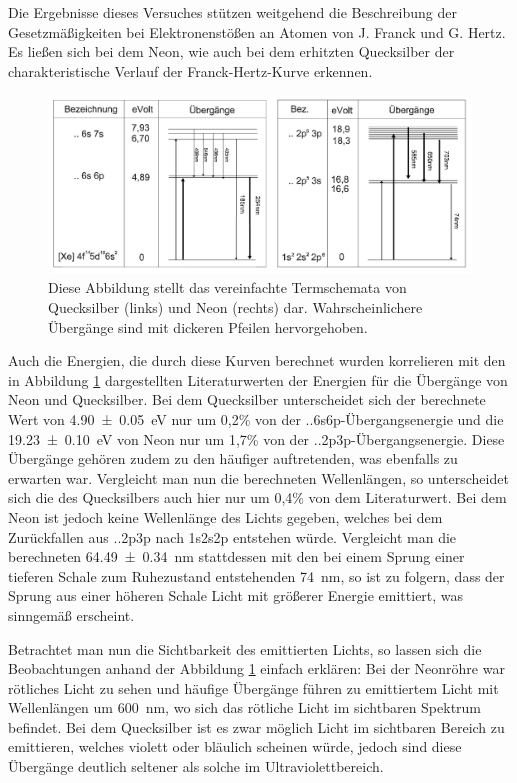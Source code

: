 	Die Ergebnisse dieses Versuches stützen weitgehend die Beschreibung der Gesetzmäßigkeiten bei Elektronenstößen an Atomen von J. Franck und G. Hertz.
	Es ließen sich bei dem Neon, wie auch bei dem erhitzten Quecksilber der charakteristische Verlauf der Franck-Hertz-Kurve erkennen.
	\begin{figure}[ht]
		\centering
		\includegraphics[width=\textwidth]{bilder/Uebergaenge.png}
		\caption{Diese Abbildung stellt das vereinfachte Termschemata von Quecksilber (links) und Neon (rechts) dar. Wahrscheinlichere Übergänge sind mit dickeren Pfeilen hervorgehoben.\cite{WWU}}
		\label{fig:Übergänge}	
	\end{figure}
	Auch die Energien, die durch diese Kurven berechnet wurden korrelieren mit den in Abbildung \ref{fig:Übergänge} dargestellten Literaturwerten der Energien für die Übergänge von Neon und Quecksilber. 
	Bei dem Quecksilber unterscheidet sich der berechnete Wert von \SI{4.90+-0.05}{\electronvolt} nur um 0,2\% von der ..6s6p-Übergangsenergie und die \SI{19.23+-0.10}{\electronvolt} von Neon nur um 1,7\% von der ..2p3p-Übergangsenergie.
	Diese Übergänge gehören zudem zu den häufiger auftretenden, was ebenfalls zu erwarten war.
	Vergleicht man nun die berechneten Wellenlängen, so unterscheidet sich die des Quecksilbers auch hier nur um 0,4\% von dem Literaturwert. 
	Bei dem Neon ist jedoch keine Wellenlänge des Lichts gegeben, welches bei dem Zurückfallen aus ..2p3p nach 1s2s2p entstehen würde. 
	Vergleicht man die berechneten \SI{64.49+-0.34}{\nano\meter} stattdessen mit den bei einem Sprung einer tieferen Schale zum Ruhezustand entstehenden  \SI{74}{\nano\meter}, so ist zu folgern, dass der Sprung aus einer höheren Schale Licht mit größerer Energie emittiert, was sinngemäß erscheint.
	
	Betrachtet man nun die Sichtbarkeit des emittierten Lichts, so lassen sich die Beobachtungen anhand der Abbildung \ref{fig:Übergänge} einfach erklären:
	Bei der Neonröhre war rötliches Licht zu sehen und häufige Übergänge führen zu emittiertem Licht mit Wellenlängen um \SI{600}{\nano\meter}, wo sich das rötliche Licht im sichtbaren Spektrum befindet.
	Bei dem Quecksilber ist es zwar möglich Licht im sichtbaren Bereich zu emittieren, welches violett oder bläulich scheinen würde, jedoch sind diese Übergänge deutlich seltener als solche im Ultraviolettbereich.
	
